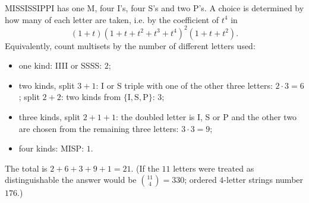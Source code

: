 MISSISSIPPI has one M, four I's, four S's and two P's. A choice is determined by how many of each letter are taken, i.e. by the coefficient of $t^4$ in
\[(1+t)(1+t+t^2+t^3+t^4)^2(1+t+t^2).\]
Equivalently, count multisets by the number of different letters used:
\begin{itemize}
\item one kind: IIII or SSSS: $2$;
\item two kinds, split $3+1$: I or S triple with one of the other three letters: $2\cdot3=6$; split $2+2$: two kinds from $\{\text{I},\text{S},\text{P}\}$: $3$;
\item three kinds, split $2+1+1$: the doubled letter is I, S or P and the other two are chosen from the remaining three letters: $3\cdot3=9$;
\item four kinds: MISP: $1$.
\end{itemize}
The total is $2+6+3+9+1=\boxed{21}$. (If the $11$ letters were treated as distinguishable the answer would be $\binom{11}{4}=330$; ordered $4$-letter strings number $176$.)
